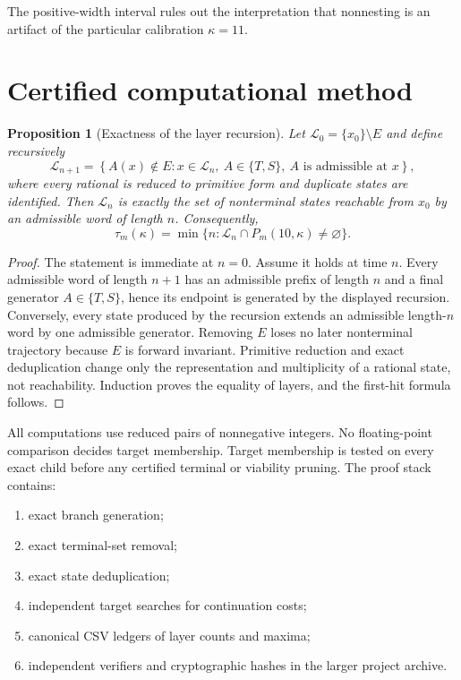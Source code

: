 \documentclass[11pt]{amsart}
\newtheorem{proposition}[theorem]{Proposition}
\theoremstyle{definition}
\begin{document}
The positive-width interval rules out the interpretation that nonnesting is an artifact of the particular calibration $\kappa=11$.

\section{Certified computational method}

\begin{proposition}[Exactness of the layer recursion]\label{prop:layer-exactness}
Let $\mathcal L_0=\{x_0\}\setminus E$ and define recursively
\[
\mathcal L_{n+1}=\left\{A(x)\notin E:
 x\in\mathcal L_n,\ A\in\{T,S\},\ A\text{ is admissible at }x\right\},
\]
where every rational is reduced to primitive form and duplicate states are identified.  Then $\mathcal L_n$ is exactly the set of nonterminal states reachable from $x_0$ by an admissible word of length $n$.  Consequently,
\[
\tau_m(\kappa)=\min\{n:\mathcal L_n\cap P_m(10,\kappa)\ne\varnothing\}.
\]
\end{proposition}

\begin{proof}
The statement is immediate at $n=0$.  Assume it holds at time $n$.  Every admissible word of length $n+1$ has an admissible prefix of length $n$ and a final generator $A\in\{T,S\}$, hence its endpoint is generated by the displayed recursion.  Conversely, every state produced by the recursion extends an admissible length-$n$ word by one admissible generator.  Removing $E$ loses no later nonterminal trajectory because $E$ is forward invariant.  Primitive reduction and exact deduplication change only the representation and multiplicity of a rational state, not reachability.  Induction proves the equality of layers, and the first-hit formula follows.
\end{proof}

All computations use reduced pairs of nonnegative integers.  No floating-point comparison decides target membership.  Target membership is tested on every exact child before any certified terminal or viability pruning.  The proof stack contains:
\begin{enumerate}
\item exact branch generation;
\item exact terminal-set removal;
\item exact state deduplication;
\item independent target searches for continuation costs;
\item canonical CSV ledgers of layer counts and maxima;
\item independent verifiers and cryptographic hashes in the larger project archive.
\end{enumerate}
\end{document}

